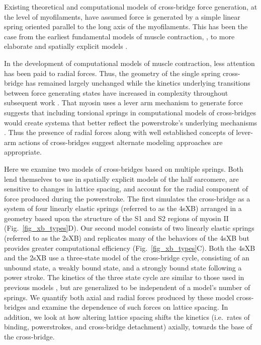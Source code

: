 \documentclass[]{article}
\begin{document}
Existing theoretical and computational models of cross-bridge force generation, at the level of myofilaments, have assumed force is generated by a simple linear spring oriented parallel to the long axis of the myofilaments.  
This has been the case from the earliest fundamental models of muscle contraction, \citet{Huxley1957}, to more elaborate and spatially explicit models \citep{Daniel1998, Chase2004, Tanner2007, Campbell2009}.  

In the development of computational models of muscle contraction, less attention has been paid to radial forces. 
Thus, the geometry of the single spring cross-bridge has remained largely unchanged while the kinetics underlying transitions between force generating states have increased in complexity throughout subsequent work \citep{Pate1989, Daniel1998, Tanner2007}.
That myosin uses a lever arm mechanism to generate force suggests that including torsional springs in computational models of cross-bridges would create systema that better reflect the powerstroke's underlying mechanisms \citep{Houdusse2001}. 
Thus the presence of radial forces along with well established concepts of lever-arm actions of cross-bridges suggest alternate modeling approaches are appropriate.

Here we examine two models of cross-bridges based on multiple springs.  
Both lend themselves to use in spatially explicit models of the half sarcomere, are sensitive to changes in lattice spacing, and account for the radial component of force produced during the powerstroke. 
The first simulates the cross-bridge as a system of four linearly elastic springs (referred to as the 4sXB) arranged in a geometry based upon the structure of the S1 and S2 regions of myosin II (Fig.~\ref{fig_xb_types}D). 
Our second model consists of two linearly elastic springs (referred to as the 2sXB) and replicates many of the behaviors of the 4sXB but provides greater computational efficiency (Fig.~\ref{fig_xb_types}C). 
Both the 4sXB and the 2sXB use a three-state model of the cross-bridge cycle, consisting of an unbound state, a weakly bound state, and a strongly bound state following a power stroke. 
The kinetics of the three state cycle are similar to those used in previous models \citep{Pate1989, Daniel1998, Tanner2007}, but are generalized to be independent of a model's number of springs.
We quantify both axial and radial forces produced by these model cross-bridges and examine the dependence of such forces on lattice spacing.
In addition, we look at how altering lattice spacing shifts the kinetics (i.e.\ rates of binding, powerstrokes, and cross-bridge detachment) axially, towards the base of the cross-bridge. 
\end{document}
